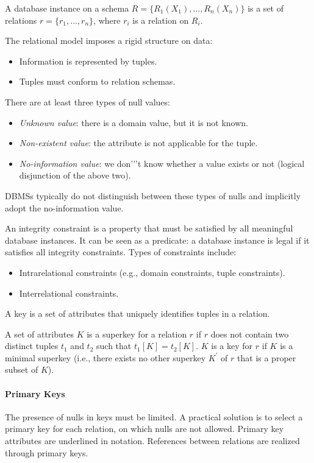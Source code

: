 \begin{definition}
    A database instance on a schema $R = \{R_1(X_1), \dots, R_n(X_n)\}$ is a set of relations $r = \{r_1, \dots, r_n\}$, where $r_i$ is a relation on $R_i$.
\end{definition}
The relational model imposes a rigid structure on data:
\begin{itemize}
    \item Information is represented by tuples.
    \item Tuples must conform to relation schemas.
\end{itemize}
There are at least three types of null values:
\begin{itemize}
    \item \textit{Unknown value}: there is a domain value, but it is not known.
    \item \textit{Non-existent value}: the attribute is not applicable for the tuple.
    \item \textit{No-information value}: we don'’'t know whether a value exists or not (logical disjunction of the above two).
\end{itemize}
DBMSs typically do not distinguish between these types of nulls and implicitly adopt the no-information value.

An integrity constraint is a property that must be satisfied by all meaningful database instances. 
It can be seen as a predicate: a database instance is legal if it satisfies all integrity constraints. 
Types of constraints include:
\begin{itemize}
    \item Intrarelational constraints (e.g., domain constraints, tuple constraints).
    \item Interrelational constraints.
\end{itemize}

\begin{definition}
    A key is a set of attributes that uniquely identifies tuples in a relation.
\end{definition}
A set of attributes $K$ is a superkey for a relation $r$ if $r$ does not contain two distinct tuples $t_1$ and $t_2$ such that $t_1[K] = t_2[K]$.
$K$ is a key for $r$ if $K$ is a minimal superkey (i.e., there exists no other superkey $K^\prime$ of $r$ that is a proper subset of $K$).

\paragraph*{Primary Keys}
The presence of nulls in keys must be limited.
A practical solution is to select a primary key for each relation, on which nulls are not allowed. 
Primary key attributes are underlined in notation. 
References between relations are realized through primary keys.

